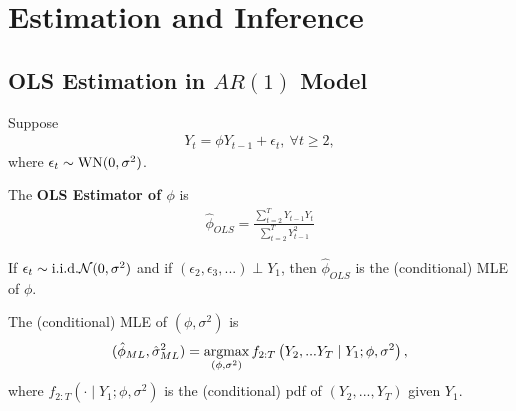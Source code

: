 \documentclass[11pt]{elegantbook}
\newcommand{\argmax}{\operatornamewithlimits{argmax}}
\begin{document}
\chapter{Estimation and Inference}

\section{OLS Estimation in $AR(1)$ Model}
Suppose
\begin{equation}
    \begin{aligned}
        Y_t=\phi Y_{t-1}+\epsilon_t,\ \forall t\geq 2,
    \end{aligned}
    \nonumber
\end{equation}
where $\epsilon_t\sim \textnormal{WN}(0,\sigma^2)$.

The \textbf{OLS Estimator of $\phi$} is
\begin{equation}
    \begin{aligned}
        \hat{\phi}_{OLS}=\frac{\sum_{t=2}^TY_{t-1}Y_t}{\sum_{t=2}^T Y_{t-1}^2}
    \end{aligned}
    \nonumber
\end{equation}

\begin{claim}
    If $\epsilon_t\sim \textnormal{i.i.d.} \mathcal{N}(0,\sigma^2)$ and if $(\epsilon_2,\epsilon_3,...)\perp Y_1$, then $\hat{\phi}_{OLS}$ is the (conditional) MLE of $\phi$.
\end{claim}
The (conditional) MLE of $(\phi,\sigma^2)$ is
\begin{equation}
    \begin{aligned}
        (\hat{\phi}_{ML},\hat{\sigma}^2_{ML})=\argmax_{(\phi,\sigma^2)} f_{2:T}\left(Y_2,...Y_T\mid Y_1;\phi,\sigma^2\right),
    \end{aligned}
    \nonumber
\end{equation}
where $f_{2:T}(\cdot\mid Y_1; \phi,\sigma^2)$ is the (conditional) pdf of $(Y_2,...,Y_T)$ given $Y_1$.
\end{document}
